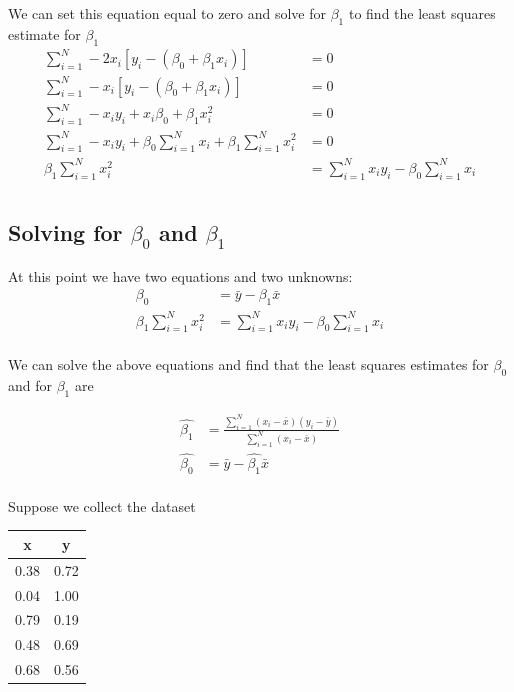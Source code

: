 We can set this equation equal to zero and solve for $\beta_{1}$ to find the least squares estimate for $\beta_{1}$
\begin{align}
    \sum_{i=1}^{N} -2x_{i}\left[y_{i} - \left(\beta_{0} + \beta_{1}x_{i} \right) \right] &= 0\\
    \sum_{i=1}^{N} -x_{i}\left[y_{i} - \left(\beta_{0} + \beta_{1}x_{i} \right) \right] &= 0\\
    \sum_{i=1}^{N} -x_{i} y_{i} + x_{i}\beta_{0} + \beta_{1}x^{2}_{i} &= 0\\
    \sum_{i=1}^{N} -x_{i} y_{i} + \beta_{0} \sum_{i=1}^{N} x_{i} + \beta_{1} \sum_{i=1}^{N} x^{2}_{i} &= 0\\
    \beta_{1} \sum_{i=1}^{N} x^{2}_{i} &= \sum_{i=1}^{N} x_{i} y_{i} - \beta_{0} \sum_{i=1}^{N} x_{i} \\
\end{align}

\subsection{Solving for $\beta_{0}$ and $\beta_{1}$}
At this point we have two equations and two unknowns:
\begin{align}
    \beta_{0} &= \bar{y} - \beta_{1} \bar{x} \\ 
     \beta_{1} \sum_{i=1}^{N} x^{2}_{i} &= \sum_{i=1}^{N} x_{i} y_{i} - \beta_{0} \sum_{i=1}^{N} x_{i} \\
\end{align}

We can solve the above equations and find that the least squares estimates for $\beta_{0}$ and for $\beta_{1}$ are

\begin{align}
    \hat{\beta_{1}} &= \frac{ \sum_{i=1}^{N} (x_{i} - \bar{x})(y_{i} - \bar{y})  }{ \sum_{i=1}^{N} (x_{i} - \bar{x}) }\\
    \hat{\beta_{0}} &= \bar{y} - \hat{\beta_{1}} \bar{x} \\
\end{align}

\ex Suppose we collect the dataset 
\begin{table}[ht!]
    \centering
    \begin{tabular}{c|c}
        x & y \\
        \hline
        0.38 & 0.72\\
        0.04 & 1.00\\
        0.79 & 0.19\\
        0.48 & 0.69\\
        0.68 & 0.56\\
    \end{tabular}
\end{table}

